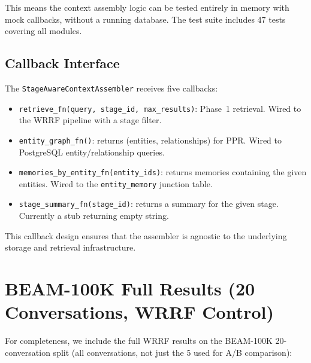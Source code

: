 \documentclass[11pt]{article}
\begin{document}
This means the context assembly logic can be tested entirely in memory
with mock callbacks, without a running database.  The test suite
includes 47 tests covering all modules.

\subsection{Callback Interface}

The \texttt{StageAwareContextAssembler} receives five callbacks:

\begin{itemize}
  \item \texttt{retrieve\_fn(query, stage\_id, max\_results)}: Phase~1
    retrieval.  Wired to the WRRF pipeline with a stage filter.
  \item \texttt{entity\_graph\_fn()}: returns (entities,
    relationships) for PPR.  Wired to PostgreSQL entity/relationship
    queries.
  \item \texttt{memories\_by\_entity\_fn(entity\_ids)}: returns
    memories containing the given entities.  Wired to the
    \texttt{entity\_memory} junction table.
  \item \texttt{stage\_summary\_fn(stage\_id)}: returns a summary for
    the given stage.  Currently a stub returning empty string.
\end{itemize}

This callback design ensures that the assembler is agnostic to the
underlying storage and retrieval infrastructure.

\section{BEAM-100K Full Results (20 Conversations, WRRF Control)}
\label{app:100k-full}

For completeness, we include the full WRRF results on the BEAM-100K
20-conversation split (all conversations, not just the 5 used for
A/B comparison):
\end{document}
